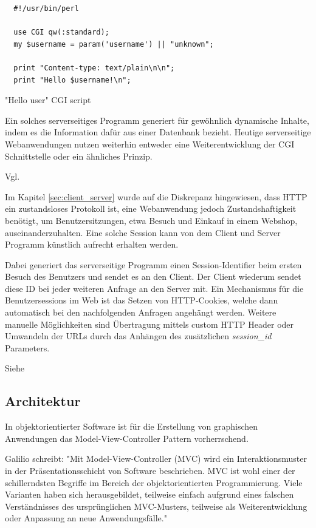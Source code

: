 \begin{listing}[H]
\begin{verbatim}
  #!/usr/bin/perl

  use CGI qw(:standard);
  my $username = param('username') || "unknown";

  print "Content-type: text/plain\n\n";
  print "Hello $username!\n";
\end{verbatim}
\caption{"Hello user" CGI script}
\label{lst:hello_pl}
\end{listing}

Ein solches serverseitiges Programm generiert für gewöhnlich dynamische Inhalte, indem es die Information dafür aus einer Datenbank bezieht. Heutige serverseitige Webanwendungen nutzen weiterhin entweder eine Weiterentwicklung der CGI Schnittstelle oder ein ähnliches Prinzip.

Vgl. \cite[Kap. 1.1]{Bekman:2003}

Im Kapitel \ref{sec:client_server} wurde auf die Diskrepanz hingewiesen, dass HTTP ein zustandsloses Protokoll ist, eine Webanwendung jedoch Zustandshaftigkeit benötigt, um Benutzersitzungen, etwa Besuch und Einkauf in einem Webshop, auseinanderzuhalten. Eine solche Session kann von dem Client und Server Programm
künstlich aufrecht erhalten werden.

Dabei generiert das serverseitige Programm einen Session-Identifier beim ersten Besuch des Benutzers und sendet es an den Client. Der Client wiederum sendet diese  ID bei jeder weiteren Anfrage an den Server mit. Ein Mechanismus für die Benutzersessions im Web ist das Setzen von HTTP-Cookies, welche dann automatisch bei den nachfolgenden Anfragen angehängt werden. Weitere manuelle Möglichkeiten sind  Übertragung mittels custom HTTP Header oder Umwandeln der URLs durch das Anhängen des zusätzlichen \emph{session\_id} Parameters.

Siehe \cite[Stateful Web Applications]{Parikh:2015}

\subsection{Architektur}

In objektorientierter Software ist für die Erstellung von graphischen Anwendungen das Model-View-Controller Pattern vorherrschend.

Galilio schreibt: "Mit Model-View-Controller (MVC) wird ein Interaktionsmuster in der Präsentationsschicht von Software beschrieben. MVC ist wohl einer der schillerndsten Begriffe im Bereich der objektorientierten Programmierung. Viele Varianten haben sich herausgebildet, teilweise einfach aufgrund eines falschen Verständnisses des ursprünglichen MVC-Musters, teilweise als Weiterentwicklung oder Anpassung an neue Anwendungsfälle."


